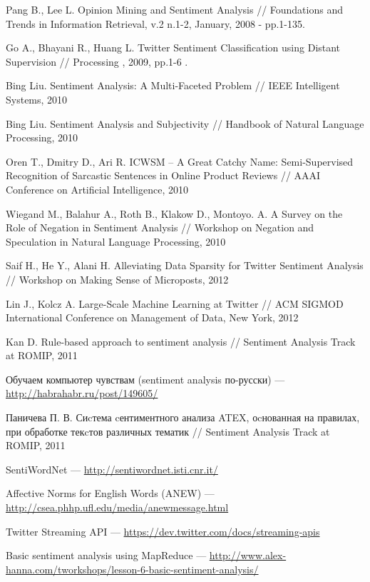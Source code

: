 Pang B., Lee L. Opinion Mining and Sentiment Analysis // Foundations and 
Trends in Information Retrieval, v.2 n.1-2, January, 2008 - pp.1-135.

Go A., Bhayani R., Huang L. Twitter Sentiment Classification using Distant Supervision // Processing , 2009, pp.1-6 .

Bing Liu. Sentiment Analysis: A Multi-Faceted Problem // IEEE Intelligent Systems, 2010

Bing Liu. Sentiment Analysis and Subjectivity // Handbook of Natural Language Processing, 2010

Oren T., Dmitry D., Ari R. ICWSM – A Great Catchy Name: Semi-Supervised Recognition of Sarcastic Sentences in Online Product Reviews // AAAI Conference on Artificial Intelligence, 2010 

Wiegand M., Balahur A., Roth B., Klakow D., Montoyo. A. A Survey on the Role of Negation in Sentiment Analysis // Workshop on Negation and Speculation in Natural Language Processing, 2010

Saif H., He Y., Alani H. Alleviating Data Sparsity for Twitter Sentiment Analysis // Workshop on Making Sense of Microposts, 2012


Lin J., Kolcz A. Large-Scale Machine Learning at Twitter // ACM SIGMOD International Conference on Management of Data, New York, 2012

Kan D. Rule-based approach to sentiment analysis // Sentiment Analysis Track at 
ROMIP, 2011

Обучаем компьютер чувствам (sentiment analysis по-русски) --- \url{http://habrahabr.ru/post/149605/}

Паничева П. В. Сиcтема cентиментного анализа ATEX, оcнованная
на правилах, при обработке текcтов различных тематик // Sentiment Analysis Track at ROMIP, 2011

SentiWordNet --- \url{http://sentiwordnet.isti.cnr.it/}

Affective Norms for English Words (ANEW) --- \url{http://csea.phhp.ufl.edu/media/anewmessage.html}

Twitter Streaming API --- \url{https://dev.twitter.com/docs/streaming-apis}

Basic sentiment analysis using MapReduce --- \url{http://www.alex-hanna.com/tworkshops/lesson-6-basic-sentiment-analysis/}

